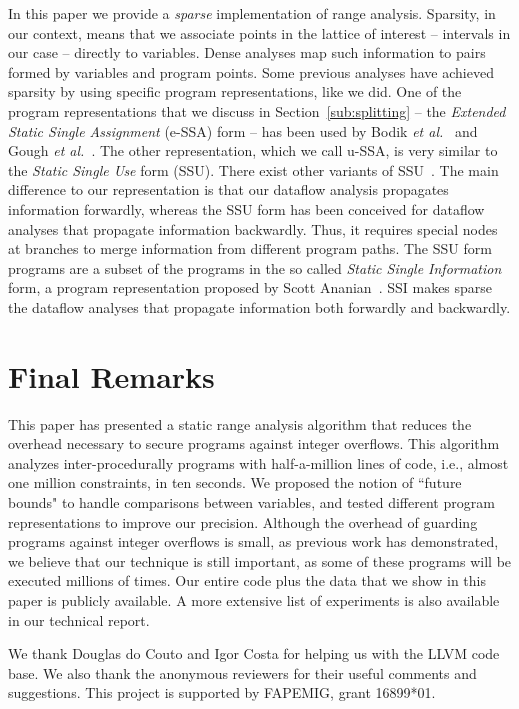 \documentclass{sigplanconf}[10pt]
\begin{document}
In this paper we provide a {\em sparse} implementation of range analysis.
Sparsity, in our context, means that we associate points in the lattice of
interest -- intervals in our case -- directly to variables.
Dense analyses map such information to pairs formed by variables and program
points.
Some previous analyses have achieved sparsity by using specific program
representations, like we did.
One of the program representations that we discuss in
Section~\ref{sub:splitting} -- the {\em
Extended Static Single Assignment} (e-SSA) form -- has been used by Bodik
{\em et al.}~\cite{Bodik00} and Gough {\em et al.}~\cite{Gough94}.
The other representation, which we call u-SSA, is very similar to
the \emph{Static Single Use} form (SSU).
There exist other variants of SSU~\cite{Lo98,Plevyak96,George03}.
The main difference to our representation is that our dataflow analysis
propagates information forwardly, whereas the SSU form has been conceived for
dataflow analyses that propagate information backwardly.
Thus, it requires special nodes at branches to merge information from
different program paths.
The SSU form programs are a subset of the programs in the so called
{\em Static Single Information} form, a program representation proposed by
Scott Ananian~\cite{Ananian99}.
SSI makes sparse the dataflow analyses that propagate information both
forwardly and backwardly.

\section{Final Remarks}
\label{sec:rem}

This paper has presented a static range analysis algorithm that reduces
the overhead necessary to secure programs against integer overflows.
This algorithm analyzes inter-procedurally programs with
half-a-million lines of code, i.e., almost one million constraints, in
ten seconds.
We proposed the notion of ``future bounds" to handle comparisons
between variables, and tested different program representations to improve our
precision.
Although the overhead of guarding programs against integer overflows is small,
as previous work has demonstrated, we believe that our technique is still
important, as some of these programs will be executed millions of times.
Our entire code plus the data that we show in this paper is publicly available.
A more extensive list of experiments is also available in our technical report.

\acks
We thank Douglas do Couto and Igor Costa for helping us with the LLVM code
base.
We also thank the anonymous reviewers for their useful comments and
suggestions.
This project is supported by FAPEMIG, grant 16899*01.



\end{document}
